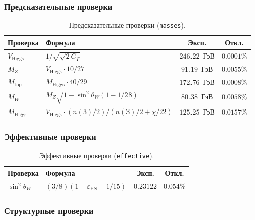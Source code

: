 \documentclass[11pt,a4paper]{article}
\theoremstyle{definition}
\begin{document}
\subsubsection{Предсказательные проверки}

\begin{table}[ht]
\centering
\caption{Предсказательные проверки (\texttt{masses}).}
\label{tab:predictive-checks}
\begin{tabular}{llcc}
\toprule
Проверка & Формула & Эксп. & Откл. \\
\midrule
$V_{\text{Higgs}}$ & $1/\sqrt{\sqrt{2} G_F}$ & $246.22$~ГэВ & $0.0001\%$ \\
$M_Z$ & $V_{\text{Higgs}} \cdot 10/27$ & $91.19$~ГэВ & $0.0055\%$ \\
$M_{\text{top}}$ & $M_{\text{Higgs}} \cdot 40/29$ & $172.76$~ГэВ & $0.0008\%$ \\
$M_W$ & $M_Z \sqrt{1 - \sin^2\theta_W (1-1/28)}$ & $80.38$~ГэВ & $0.0058\%$ \\
$M_{\text{Higgs}}$ & $V_{\text{Higgs}} \cdot (n(3)/2)/(n(3)/2 + \chi/22)$
    & $125.25$~ГэВ & $0.0157\%$ \\
\bottomrule
\end{tabular}
\end{table}

\subsubsection{Эффективные проверки}

\begin{table}[ht]
\centering
\caption{Эффективные проверки (\texttt{effective}).}
\label{tab:effective-checks}
\begin{tabular}{llcc}
\toprule
Проверка & Формула & Эксп. & Откл. \\
\midrule
$\sin^2\theta_W$ & $(3/8)(1 - \varepsilon_{\text{FN}} - 1/15)$
    & $0.23122$ & $0.054\%$ \\
\bottomrule
\end{tabular}
\end{table}

\subsubsection{Структурные проверки}
\end{document}
